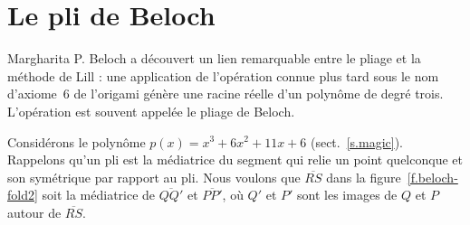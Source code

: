 \section{Le pli de Beloch}\label{s.beloch-fold}

Margharita P. Beloch a découvert un lien remarquable entre le pliage et la méthode de Lill : une application de l'opération connue plus tard sous le nom d'axiome~6 de l'origami génère une racine réelle d'un polynôme de degré trois. L'opération est souvent appelée le 
 pliage de Beloch.

Considérons le polynôme $p(x)=x^3+6x^2+11x+6$ (sect.~\ref{s.magic}). Rappelons qu'un pli est la médiatrice du segment  qui relie un point quelconque et son symétrique par rapport au pli. Nous voulons que $\overline{RS}$ dans la figure~\ref{f.beloch-fold2} soit la médiatrice de $\overline{QQ'}$ et $\overline{PP'}$, où $Q'$ et $P'$ sont les images de $Q$ et $P$ autour de $\overline{RS}$.

